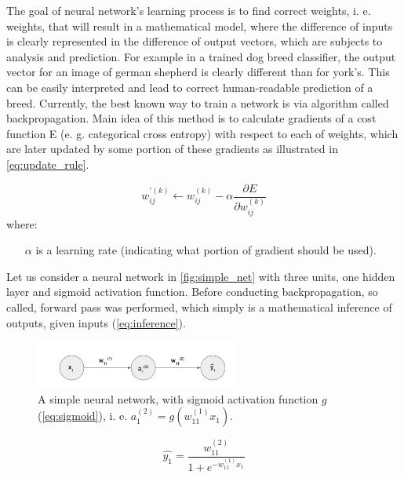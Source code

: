 \documentclass[11pt]{article}
\begin{document}
The goal of neural network's learning process is to find correct weights, i. e. weights, that will result in a mathematical model, where the difference of inputs is clearly represented in the difference of output vectors, which are subjects to analysis and prediction. For example in a trained dog breed classifier, the output vector for an image of german shepherd is clearly different than for york's. This can be easily interpreted and lead to correct human-readable prediction of a breed. Currently, the best known way to train a network is via algorithm called backpropagation. Main idea of this method is to calculate gradients of a cost function E (e. g. categorical cross entropy) with respect to each of weights, which are later updated by some portion of these gradients as illustrated in \autoref{eq:update_rule}.

\begin{equation} \label{eq:update_rule}
w_{ij}^{'(k)} \leftarrow w_{ij}^{(k)} - \alpha\frac{\partial E}{\partial w_{ij}^{(k)}}
\end{equation}
where:
\begin{itemize}
\item[$\alpha$] is a learning rate (indicating what portion of gradient should be used).
\end{itemize}

Let us consider a neural network in \autoref{fig:simple_net} with three units, one hidden layer and sigmoid activation function. Before conducting backpropagation, so called, forward pass was performed, which simply is a mathematical inference of outputs, given inputs (\autoref{eq:inference}).\\

\begin{figure}[h]
\includegraphics[width=0.6\textwidth]{simple_net}
\centering
\caption{A simple neural network, with sigmoid activation function $g$ (\autoref{eq:sigmoid}), i. e. $a_1^{(2)}=g(w_{11}^{(1)}x_1)$.}
\label{fig:simple_net}
\end{figure}

\begin{equation} \label{eq:inference}
\hat{y_1} = \frac{w_{11}^{(2)}}{1 + e^{-w_{11}^{(1)}x_1}}
\end{equation}
\end{document}
